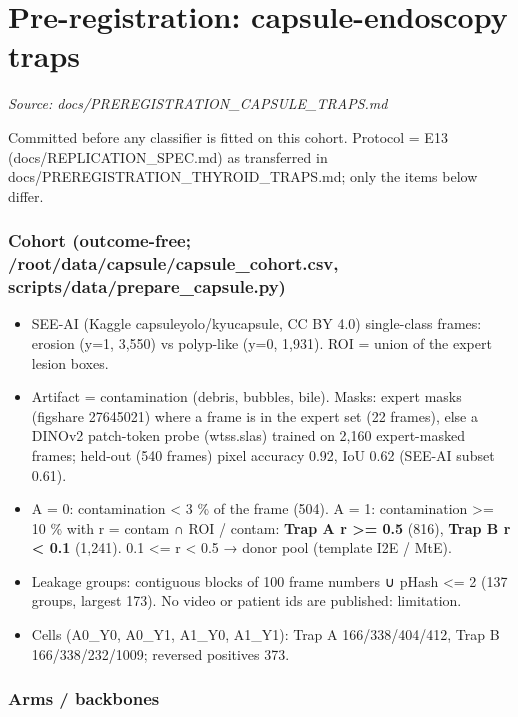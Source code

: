 \section{Pre-registration: capsule-endoscopy traps}\label{doc:PREREGISTRATION_CAPSULE_TRAPS}
\noindent\textit{Source: docs/PREREGISTRATION\_CAPSULE\_TRAPS.md}

{\small
Committed before any classifier is fitted on this cohort. Protocol = E13 (docs/REPLICATION\_SPEC.md) as
transferred in docs/PREREGISTRATION\_THYROID\_TRAPS.md; only the items below differ.

\subsubsection{Cohort (outcome-free; /root/data/capsule/capsule\_cohort.csv, scripts/data/prepare\_capsule.py)}\label{cohort-outcome-free-rootdatacapsulecapsule_cohortcsv-scriptsdataprepare_capsulepy}

\begin{itemize}

\item
  SEE-AI (Kaggle capsuleyolo/kyucapsule, CC BY 4.0) single-class frames: erosion (y=1, 3,550) vs polyp-like
  (y=0, 1,931). ROI = union of the expert lesion boxes.
\item
  Artifact = contamination (debris, bubbles, bile). Masks: expert masks (figshare 27645021) where a frame is in the
  expert set (22 frames), else a DINOv2 patch-token probe (wtss.slas) trained on 2,160 expert-masked frames;
  held-out (540 frames) pixel accuracy 0.92, IoU 0.62 (SEE-AI subset 0.61).
\item
  A = 0: contamination \textless{} 3 \% of the frame (504). A = 1: contamination \textgreater= 10 \% with r = \textbar contam ∩ ROI\textbar{} / \textbar contam\textbar:
  \textbf{Trap A r \textgreater= 0.5} (816), \textbf{Trap B r \textless{} 0.1} (1,241). 0.1 \textless= r \textless{} 0.5 → donor pool (template I2E / MtE).
\item
  Leakage groups: contiguous blocks of 100 frame numbers ∪ pHash \textless= 2 (137 groups, largest 173). No video or
  patient ids are published: limitation.
\item
  Cells (A0\_Y0, A0\_Y1, A1\_Y0, A1\_Y1): Trap A 166/338/404/412, Trap B 166/338/232/1009; reversed positives 373.
\end{itemize}

\subsubsection{Arms / backbones}\label{arms--backbones}

}
